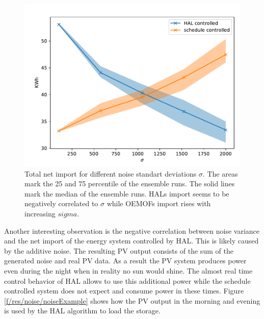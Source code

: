 \documentclass[a4paper,12pt]{book}
\theoremstyle{break}
\begin{document}
\begin{figure}[htp]
	\centering
	\includegraphics[width=\textwidth]{noiseTotalNet}
	\caption{Total net import for different noise standart deviations $\sigma$. The areas mark the 25 and 75 percentile of the ensemble runs. The solid lines mark the median of the ensemble runs. HALs import seems to be negatively correlated to $\sigma$ while OEMOFs import rises with increasing $sigma$.}
	\label{f/res/noise/total}
\end{figure}

Another interesting observation is the negative correlation between noise variance and the net import of the energy system controlled by HAL. This is likely caused by the additive noise. The resulting \ac{PV} output consists of the sum of the generated noise and real \ac{PV} data. As a result the \ac{PV} system produces power even during the night when in reality no sun would shine. The almost real time control behavior of HAL allows to use this additional power while the schedule controlled system does not expect and consume power in these times. Figure \ref{f/res/noise/noiseExample} shows how the PV output in the morning and evening is used by the HAL algorithm to load the storage.
\end{document}
